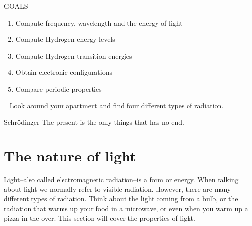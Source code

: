 \documentclass[main.tex]{subfiles}
\begin{document}
\begin{marginfigure}%
\begin{mytcbox}{GOALS}
\begin{enumerate}[label=\protect\circled{\color{white}\arabic*}]
\item Compute frequency, wavelength and the energy of light
\item Compute Hydrogen energy levels  
\item Compute Hydrogen transition energies 
\item Obtain electronic configurations
\item Compare periodic properties
\end{enumerate}
\end{mytcbox}
\vspace{1cm}
\begin{tcolorbox}[enhanced,colback=red!5!white,colframe=black!50!red,boxrule=1pt,
  arc=0pt,outer arc=0pt,drop heavy lifted shadow]
\faGears\ 
 Look around your apartment and find four different types of radiation.\end{tcolorbox}
\vspace{1cm}
    \begin{shadequote}[l]{Schr\"{o}dinger}
The present is the only things that has no end.\end{shadequote}   
 \end{marginfigure}%

 

\section{The nature of light}
Light--also called electromagnetic radiation--is a form or energy. When talking about light we normally refer to visible radiation. However, there are many different types of radiation. Think about the light coming from a bulb, or the radiation that warms up your food in a microwave, or even when you warm up a pizza in the over. This section will cover the properties of light.
\end{document}
